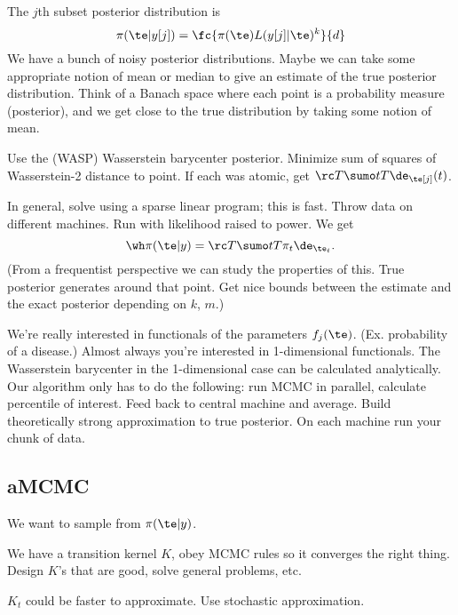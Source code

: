The $j$th subset posterior distribution is
$$
\pi(\te|y[j]) = \fc{\pi(\te)L(y[j]|\te)^k}{d}
$$
We have a bunch of noisy posterior distributions. Maybe we can take some appropriate notion of mean or median to give an estimate of the true posterior distribution. Think of a Banach space where each point is a probability measure (posterior), and we get close to the true distribution by taking some notion of mean.

Use the (WASP) Wasserstein barycenter posterior. Minimize sum of squares of Wasserstein-2 distance to point. %
If each was atomic, get $\rc T \sumo tT \de_{\te[j]}(t)$.

In general, solve using a sparse linear program; this is fast. Throw data on different machines. Run with likelihood raised to power. 
We get
$$
\wh \pi(\te|y) = \rc T\sumo tT \pi_t\de_{\te_t}.
$$
(From a frequentist perspective we can study the properties of this. 
True posterior generates around that point.
Get nice bounds between the estimate and the exact posterior depending on $k$, $m$.) %


We're really interested in functionals of the parameters $f_j(\te)$. (Ex. probability of a disease.) Almost always you're interested in 1-dimensional functionals. The Wasserstein barycenter in the 1-dimensional case can be calculated analytically. Our algorithm only has to do the following: run MCMC in parallel, calculate percentile of interest. Feed back to central machine and average. Build theoretically strong approximation to true posterior. On each machine run your chunk of data. 

\subsection{aMCMC}
We want to sample from $\pi(\te|y)$. 

We have a transition kernel $K$, obey MCMC rules so it converges the right thing. Design $K$'s that are good, solve general problems, etc.

$K_t$ could be faster to approximate. Use stochastic approximation. %

